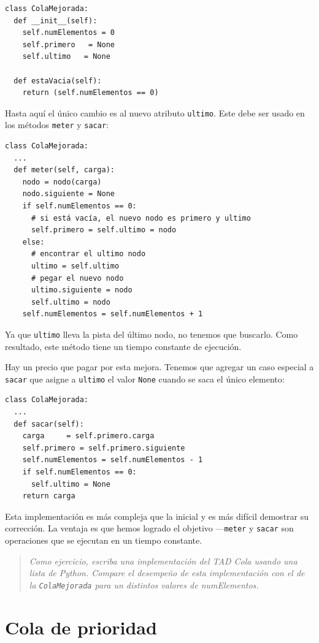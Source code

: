 \beforeverb 
\begin{verbatim}
class ColaMejorada:
  def __init__(self):
    self.numElementos = 0
    self.primero   = None
    self.ultimo   = None

  def estaVacia(self):
    return (self.numElementos == 0)
\end{verbatim}
\afterverb Hasta aquí el único cambio es al nuevo atributo \texttt{ultimo}.
Este debe ser usado en los métodos \texttt{meter} y \texttt{sacar}:

\beforeverb 
\begin{verbatim}
class ColaMejorada:
  ...
  def meter(self, carga):
    nodo = nodo(carga)
    nodo.siguiente = None
    if self.numElementos == 0:
      # si está vacía, el nuevo nodo es primero y ultimo
      self.primero = self.ultimo = nodo
    else:
      # encontrar el ultimo nodo
      ultimo = self.ultimo
      # pegar el nuevo nodo
      ultimo.siguiente = nodo
      self.ultimo = nodo
    self.numElementos = self.numElementos + 1
\end{verbatim}
\afterverb Ya que \texttt{ultimo} lleva la pista del último nodo,
no tenemos que buscarlo. Como resultado, este método tiene un tiempo
constante de ejecución.

Hay un precio que pagar por esta mejora. Tenemos que agregar un caso
especial a \texttt{sacar} que asigne a \texttt{ultimo} el valor \texttt{None}
cuando se saca el único elemento:

\beforeverb 
\begin{verbatim}
class ColaMejorada:
  ...
  def sacar(self):
    carga     = self.primero.carga
    self.primero = self.primero.siguiente
    self.numElementos = self.numElementos - 1
    if self.numElementos == 0:
      self.ultimo = None
    return carga
\end{verbatim}
\afterverb Esta implementación es más compleja que la inicial y es
más difícil demostrar su corrección. La ventaja es que hemos logrado
el objetivo —\texttt{meter} y \texttt{sacar} son operaciones que se
ejecutan en un tiempo constante.
\begin{quote}
{\em Como ejercicio, escriba una implementación del TAD Cola usando
una lista de Python. Compare el desempeño de esta implementación con
el de la \texttt{ColaMejorada} para un distintos valores de numElementos.} 
\end{quote}

\section{Cola de prioridad}

